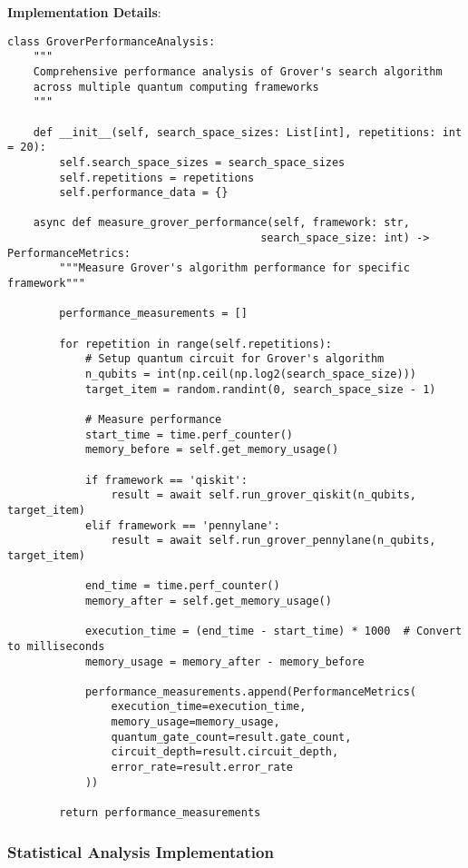 \documentclass[12pt,a4paper]{report}
\begin{document}
\textbf{Implementation Details}:
\begin{lstlisting}
class GroverPerformanceAnalysis:
    """
    Comprehensive performance analysis of Grover's search algorithm
    across multiple quantum computing frameworks
    """

    def __init__(self, search_space_sizes: List[int], repetitions: int = 20):
        self.search_space_sizes = search_space_sizes
        self.repetitions = repetitions
        self.performance_data = {}

    async def measure_grover_performance(self, framework: str,
                                       search_space_size: int) -> PerformanceMetrics:
        """Measure Grover's algorithm performance for specific framework"""

        performance_measurements = []

        for repetition in range(self.repetitions):
            # Setup quantum circuit for Grover's algorithm
            n_qubits = int(np.ceil(np.log2(search_space_size)))
            target_item = random.randint(0, search_space_size - 1)

            # Measure performance
            start_time = time.perf_counter()
            memory_before = self.get_memory_usage()

            if framework == 'qiskit':
                result = await self.run_grover_qiskit(n_qubits, target_item)
            elif framework == 'pennylane':
                result = await self.run_grover_pennylane(n_qubits, target_item)

            end_time = time.perf_counter()
            memory_after = self.get_memory_usage()

            execution_time = (end_time - start_time) * 1000  # Convert to milliseconds
            memory_usage = memory_after - memory_before

            performance_measurements.append(PerformanceMetrics(
                execution_time=execution_time,
                memory_usage=memory_usage,
                quantum_gate_count=result.gate_count,
                circuit_depth=result.circuit_depth,
                error_rate=result.error_rate
            ))

        return performance_measurements
\end{lstlisting}

\subsubsection{Statistical Analysis Implementation}
\end{document}
